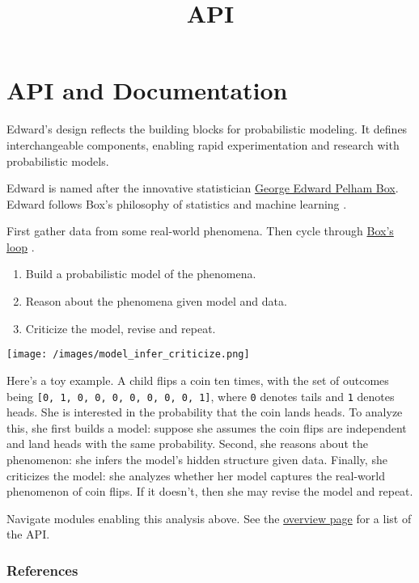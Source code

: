 \title{API}

\section{API and Documentation}

Edward's design reflects the building blocks for probabilistic
modeling. It defines interchangeable components, enabling rapid
experimentation and research with probabilistic models.

Edward is named after the innovative statistician
\href{https://en.wikipedia.org/wiki/George_E._P._Box}{George Edward
Pelham Box}. Edward follows Box's philosophy of statistics and machine
learning \citep{box1976science}.

First gather data from some real-world phenomena. Then cycle through
\href{http://www.annualreviews.org/eprint/7xbyci3nwAg5kEttvvjk/full/10.1146/annurev-statistics-022513-115657}
{Box's loop} \citep{blei2014build}.

\begin{enumerate}
\item Build a probabilistic model of the phenomena.
\item Reason about the phenomena given model and data.
\item Criticize the model, revise and repeat.
\end{enumerate}

\texttt{[image: /images/model\_infer\_criticize.png]}

Here's a toy example. A child flips a coin ten times, with the set of outcomes
being \texttt{{[}0,\ 1,\ 0,\ 0,\ 0,\ 0,\ 0,\ 0,\ 0,\ 1{]}}, where \texttt{0}
denotes tails and \texttt{1} denotes heads. She is interested in the
probability that the coin lands heads. To analyze this, she first
builds a model: suppose she assumes the coin flips are independent and
land heads with the same probability. Second, she reasons about the
phenomenon: she infers the model's hidden structure given data.
Finally, she criticizes the model: she analyzes whether her model
captures the real-world phenomenon of coin flips. If it doesn't, then
she may revise the model and repeat.

Navigate modules enabling this analysis above.
See the
\href{/api/overview}{overview page} for a list of the API.

\subsubsection{References}\label{references}
